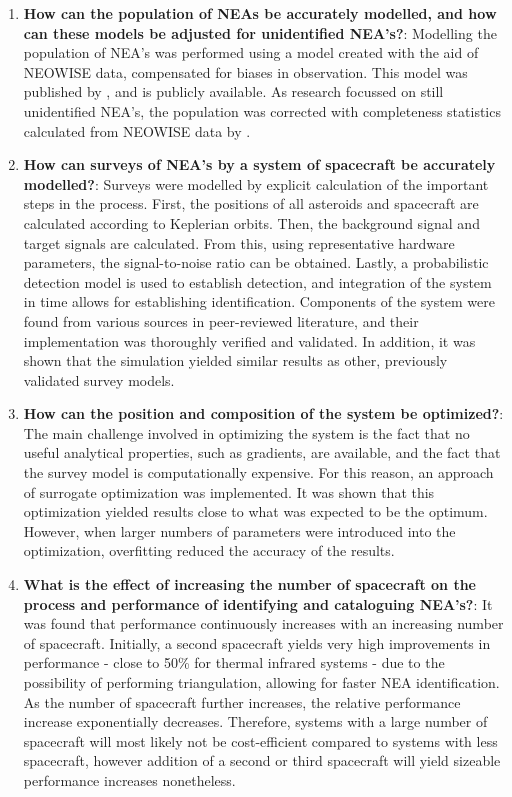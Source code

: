 \begin{enumerate}
 \item \textbf{How can the population of NEAs be accurately modelled, and how can these models be adjusted for unidentified NEA's?}: Modelling the population of NEA's was performed using a model created with the aid of NEOWISE data, compensated for biases in observation. This model was published by \cite{GranvikPopulation}, and is publicly available. As research focussed on still unidentified NEA's, the population was corrected with completeness statistics calculated from NEOWISE data by \cite{HarrisPopulation}. 
 \item \textbf{How can surveys of NEA's by a system of spacecraft be accurately modelled?}: Surveys were modelled by explicit calculation of the important steps in the process. First, the positions of all asteroids and spacecraft are calculated according to Keplerian orbits. Then, the background signal and target signals are calculated. From this, using representative hardware parameters, the signal-to-noise ratio can be obtained. Lastly, a probabilistic detection model is used to establish detection, and integration of the system in time allows for establishing identification. Components of the system were found from various sources in peer-reviewed literature, and their implementation was thoroughly verified and validated. In addition, it was shown that the simulation yielded similar results as other, previously validated survey models.
 \item \textbf{How can the position and composition of the system be optimized?}: The main challenge involved in optimizing the system is the fact that no useful analytical properties, such as gradients, are available, and the fact that the survey model is computationally expensive. For this reason, an approach of surrogate optimization was implemented. It was shown that this optimization yielded results close to what was expected to be the optimum. However, when larger numbers of parameters were introduced into the optimization, overfitting reduced the accuracy of the results.
 \item \textbf{What is the effect of increasing the number of spacecraft on the process and performance of identifying and cataloguing NEA's?}: It was found that performance continuously increases with an increasing number of spacecraft. Initially, a second spacecraft yields very high improvements in performance - close to 50\% for thermal infrared systems - due to the possibility of performing triangulation, allowing for faster NEA identification. As the number of spacecraft further increases, the relative performance increase exponentially decreases. Therefore, systems with a large number of spacecraft will most likely not be cost-efficient compared to systems with less spacecraft, however addition of a second or third spacecraft will yield sizeable performance increases nonetheless.

\end{enumerate}
